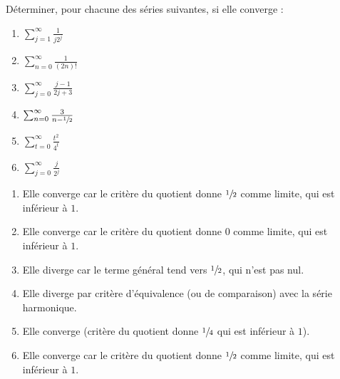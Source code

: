 \documentclass[12pt,french,oneside,a4paper]{memoir} %
\begin{document}
\begin{exo}
  Déterminer, pour chacune des séries suivantes, si elle converge :
  \begin{multicols}{2}
    \begin{enumerate}
    \item $\sum_{j=1}^{\infty} \frac{1}{j 2^{j}}$
    \item $\sum_{n=0}^{\infty} \frac{1}{(2n)!}$
    \item $\sum_{j=0}^{\infty} \frac{j-1}{2j+3}$
    \item $\sum_{n=0}^{\infty} \frac{3}{n-\sfrac12}$
    \item $\sum_{t=0}^{\infty} \frac{t^{2}}{4^{t}}$
    \item $\sum_{j=0}^{\infty} \frac{j}{2^{j}}$
    \end{enumerate}
  \end{multicols}
  \begin{correction}
    \begin{enumerate}
    \item Elle converge car le critère du quotient donne $\sfrac 12$ comme limite, qui est inférieur à $1$.
    \item Elle converge car le critère du quotient donne $0$ comme limite, qui est inférieur à $1$.
    \item Elle diverge car le terme général tend vers $\sfrac 12$, qui n'est pas nul.
    \item Elle diverge par critère d'équivalence (ou de comparaison) avec la série harmonique.
    \item Elle converge (critère du quotient donne $\sfrac 14$ qui est inférieur à $1$).
    \item Elle converge car le critère du quotient donne $\sfrac 12$ comme limite, qui est inférieur à $1$.
    \end{enumerate}
\end{correction}
\end{exo}
\end{document}
